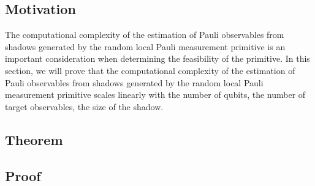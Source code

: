 \documentclass[12pt]{article}
\begin{document}
    \subsection{Motivation}
    The computational complexity of the estimation of Pauli observables from shadows generated by the random local Pauli measurement primitive is an important consideration when determining the feasibility of the primitive. In this section, we will prove that the computational complexity of the estimation of Pauli observables from shadows generated by the random local Pauli measurement primitive scales linearly with the number of qubits, the number of target observables, the size of the shadow.

    \subsection{Theorem}

    \subsection{Proof}
\end{document}
